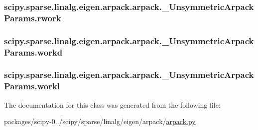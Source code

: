 \subsubsection[{rwork}]{\setlength{\rightskip}{0pt plus 5cm}scipy.\+sparse.\+linalg.\+eigen.\+arpack.\+arpack.\+\_\+\+Unsymmetric\+Arpack\+Params.\+rwork}\label{classscipy_1_1sparse_1_1linalg_1_1eigen_1_1arpack_1_1arpack_1_1__UnsymmetricArpackParams_a6c96054d1a65bc3753f1e54628f2dc72}
\hypertarget{classscipy_1_1sparse_1_1linalg_1_1eigen_1_1arpack_1_1arpack_1_1__UnsymmetricArpackParams_a5f47432e74ecedae49333070e611e87e}{}
\subsubsection[{workd}]{\setlength{\rightskip}{0pt plus 5cm}scipy.\+sparse.\+linalg.\+eigen.\+arpack.\+arpack.\+\_\+\+Unsymmetric\+Arpack\+Params.\+workd}\label{classscipy_1_1sparse_1_1linalg_1_1eigen_1_1arpack_1_1arpack_1_1__UnsymmetricArpackParams_a5f47432e74ecedae49333070e611e87e}
\hypertarget{classscipy_1_1sparse_1_1linalg_1_1eigen_1_1arpack_1_1arpack_1_1__UnsymmetricArpackParams_a12e15ff4e1eb5f1ac5343ec52453c873}{}
\subsubsection[{workl}]{\setlength{\rightskip}{0pt plus 5cm}scipy.\+sparse.\+linalg.\+eigen.\+arpack.\+arpack.\+\_\+\+Unsymmetric\+Arpack\+Params.\+workl}\label{classscipy_1_1sparse_1_1linalg_1_1eigen_1_1arpack_1_1arpack_1_1__UnsymmetricArpackParams_a12e15ff4e1eb5f1ac5343ec52453c873}


The documentation for this class was generated from the following file\+:\begin{DoxyCompactItemize}
\item 
packages/scipy-\/0../scipy/sparse/linalg/eigen/arpack/\hyperlink{arpack_8py}{arpack.\+py}\end{DoxyCompactItemize}
